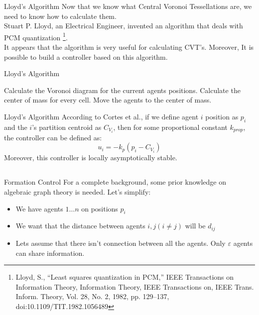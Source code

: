 \documentclass[t]{beamer}
\begin{document}
\begin{frame}[label=lloydsalg1]{Lloyd's Algorithm}
Now that we know what Central Voronoi Tessellations are, we need to know how to calculate them. \\
Stuart P. Lloyd, an Electrical Engineer, invented an algorithm that deals with PCM quantization \footnote{Lloyd, S., “Least squares quantization in PCM,” IEEE Transactions on Information Theory, Information Theory, IEEE Transactions on, IEEE Trans. Inform. Theory, Vol. 28, No. 2, 1982, pp. 129–137, doi:10.1109/TIT.1982.1056489}.
\\
It appears that the algorithm is very useful for calculating CVT's. Moreover, It is possible to build a controller based on this algorithm.
\end{frame}

\begin{frame}[label=lloydsalg2]{Lloyd's Algorithm}
\begin{algorithm}[H]
\caption{Lloyd's Algorithm}\label{LloydAlgo}
\begin{algorithmic}[1]
\State Calculate the Voronoi diagram for the current agents positions.
\State Calculate the center of mass for every cell.
\State Move the agents to the center of mass.
\end{algorithmic}
\end{algorithm}
\end{frame}

\begin{frame}[label=lloydsalg3]{Lloyd's Algorithm}
According to Cortes et al., if we define agent $i$ position as $p_i$ and the $i$'s partition centroid as $C_{V_{i}}$, then for some proportional constant $k_{prop}$, the controller can be defined as:
\begin{equation} \label{Lloyds contoller}
u_{i} = -k_{p}\left( p_i - C_{V_{i}} \right)
\end{equation} 
Moreover, this controller is locally asymptotically stable.
\end{frame}

\subsection[Distance-Based Formation Control]{}
\begin{frame}[label=distanceformation1]{Formation Control}
For a complete background, some prior knowledge on algebraic graph theory is needed. Let's simplify:
\begin{itemize}
\item<1-> We have agents $1 \ldots n$ on positions $p_{i}$
\item<2-> We want that the distance between agents $i,j (i \neq j)$ will be $d_{ij}$
\item<3-> Lets assume that there isn't connection between all the agents. Only $\varepsilon$ agents can share information.
\end{itemize}
\end{frame}
\end{document}
